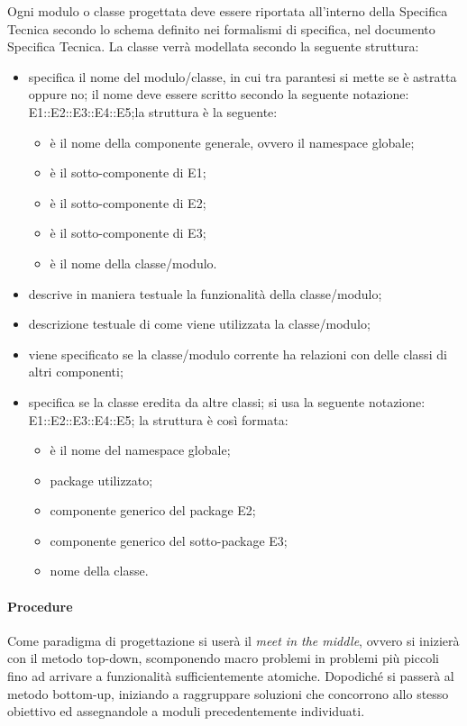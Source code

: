 Ogni modulo o classe progettata deve essere riportata all'interno della Specifica Tecnica secondo lo schema definito nei formalismi di specifica, nel documento Specifica Tecnica. La classe verrà modellata secondo la seguente struttura:
\begin{itemize}
\item {}specifica il nome del  modulo/classe, in cui tra parantesi si mette se è astratta oppure no; il nome deve essere scritto secondo la seguente notazione: E1::E2::E3::E4::E5;la struttura è la seguente:
\begin{itemize}
\item {}è il nome della componente generale, ovvero il namespace globale;
\item {}è il sotto-componente di E1;
\item {}è il sotto-componente di E2;
\item {}è il sotto-componente di E3;
\item {}è il nome della classe/modulo.
\end{itemize}
\item {}descrive in maniera testuale la funzionalità della classe/modulo;
\item {}descrizione testuale di come viene utilizzata la classe/modulo;
\item {}viene specificato se la classe/modulo corrente ha relazioni con delle classi di altri componenti;
\item {}specifica se la classe eredita da altre classi; si usa la seguente notazione: E1::E2::E3::E4::E5; la struttura è così formata:
\begin{itemize}
\item {}è il nome del namespace globale;
\item {}package utilizzato;
\item {}componente generico del package E2;
\item {}componente generico del sotto-package E3;
\item {}nome della classe.
\end{itemize}
\end{itemize}

\paragraph{Procedure}
Come paradigma di progettazione si userà il \textit{meet in the middle}, ovvero si inizierà con il metodo top-down, scomponendo macro problemi in problemi più piccoli fino ad arrivare a funzionalità sufficientemente atomiche.
Dopodiché si passerà al metodo bottom-up, iniziando a raggruppare soluzioni che concorrono allo stesso obiettivo ed assegnandole a moduli precedentemente individuati.


